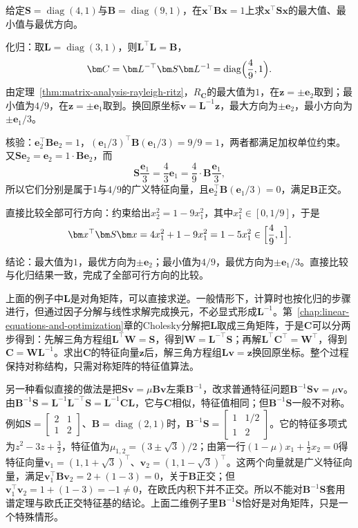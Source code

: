 \begin{example}[加权约束下的最优方向]
\label{ex:ls-generalized-rayleigh-diagonal}
给定$\bm S=\operatorname{diag}(4,1)$与$\bm B=\operatorname{diag}(9,1)$，在$\bm x^\top\bm B\bm x=1$上求$\bm x^\top\bm S\bm x$的最大值、最小值与最优方向。

化归：取$\bm L=\operatorname{diag}(3,1)$，则$\bm L^\top\bm L=\bm B$，
\[
 \bm C=\bm L^{-\top}\bm S\bm L^{-1}=\operatorname{diag}\Bigl(\frac49,1\Bigr).
\]
由定理~\ref{thm:matrix-analysis-rayleigh-ritz}，$R_{\bm C}$的最大值为$1$，在$\bm z=\pm\bm e_2$取到；最小值为$4/9$，在$\bm z=\pm\bm e_1$取到。换回原坐标$\bm v=\bm L^{-1}\bm z$，最大方向为$\pm\bm e_2$，最小方向为$\pm\bm e_1/3$。

核验：$\bm e_2^\top\bm B\bm e_2=1$，$(\bm e_1/3)^\top\bm B(\bm e_1/3)=9/9=1$，两者都满足加权单位约束。又$\bm S\bm e_2=\bm e_2=1\cdot\bm B\bm e_2$，而
\[
 \bm S\frac{\bm e_1}{3}=\frac43\bm e_1=\frac49\cdot\bm B\frac{\bm e_1}{3},
\]
所以它们分别是属于$1$与$4/9$的广义特征向量，且$\bm e_2^\top\bm B(\bm e_1/3)=0$，满足$\bm B$正交。

直接比较全部可行方向：约束给出$x_2^2=1-9x_1^2$，其中$x_1^2\in[0,1/9]$，于是
\[
 \bm x^\top\bm S\bm x=4x_1^2+1-9x_1^2=1-5x_1^2\in\Bigl[\frac49,1\Bigr].
\]

结论：最大值为$1$，最优方向为$\pm\bm e_2$；最小值为$4/9$，最优方向为$\pm\bm e_1/3$。直接比较与化归结果一致，完成了全部可行方向的比较。
\end{example}

上面的例子中$\bm L$是对角矩阵，可以直接求逆。一般情形下，计算时也按化归的步骤进行，但通过因子分解与线性求解完成换元，不必显式形成$\bm L^{-1}$。第~\ref{chap:linear-equations-and-optimization}章的Cholesky分解把$\bm L$取成三角矩阵，于是$\bm C$可以分两步得到：先解三角方程组$\bm L^\top\bm W=\bm S$，得到$\bm W=\bm L^{-\top}\bm S$；再解$\bm L^\top\bm C^\top=\bm W^\top$，得到$\bm C=\bm W\bm L^{-1}$。求出$\bm C$的特征向量$\bm z$后，解三角方程组$\bm L\bm v=\bm z$换回原坐标。整个过程保持对称结构，只需对称矩阵的特征值算法。

另一种看似直接的做法是把$\bm S\bm v=\mu\bm B\bm v$左乘$\bm B^{-1}$，改求普通特征问题$\bm B^{-1}\bm S\bm v=\mu\bm v$。由$\bm B^{-1}\bm S=\bm L^{-1}\bm L^{-\top}\bm S=\bm L^{-1}\bm C\bm L$，它与$\bm C$相似，特征值相同；但$\bm B^{-1}\bm S$一般不对称。例如$\bm S=\left[\begin{smallmatrix}2&1\\1&2\end{smallmatrix}\right]$、$\bm B=\operatorname{diag}(2,1)$时，$\bm B^{-1}\bm S=\left[\begin{smallmatrix}1&1/2\\1&2\end{smallmatrix}\right]$。它的特征多项式为$z^2-3z+\tfrac32$，特征值为$\mu_{1,2}=(3\pm\sqrt3)/2$；由第一行$(1-\mu)x_1+\tfrac12x_2=0$得特征向量$\bm v_1=(1,1+\sqrt3)^\top$、$\bm v_2=(1,1-\sqrt3)^\top$。这两个向量就是广义特征向量，满足$\bm v_1^\top\bm B\bm v_2=2+(1-3)=0$，关于$\bm B$正交；但$\bm v_1^\top\bm v_2=1+(1-3)=-1\neq0$，在欧氏内积下并不正交。所以不能对$\bm B^{-1}\bm S$套用谱定理与欧氏正交特征基的结论。上面二维例子里$\bm B^{-1}\bm S$恰好是对角矩阵，只是一个特殊情形。

